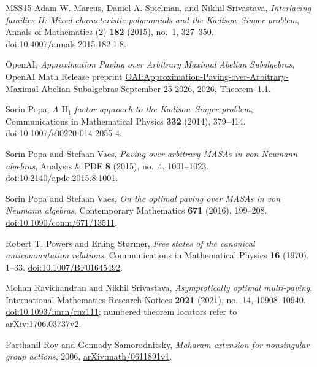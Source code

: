 \begin{thebibliography}{MSS15}
Adam W. Marcus, Daniel A. Spielman, and Nikhil Srivastava,
\emph{Interlacing families II: Mixed characteristic polynomials and the Kadison--Singer problem},
Annals of Mathematics (2) \textbf{182} (2015), no.~1, 327--350.
\href{https://doi.org/10.4007/annals.2015.182.1.8}{doi:10.4007/annals.2015.182.1.8}.

OpenAI,
\emph{Approximation Paving over Arbitrary Maximal Abelian Subalgebras},
OpenAI Math Release preprint
\href{https://github.com/openai/math/blob/main/preprints/Approximation-Paving-over-Arbitrary-Maximal-Abelian-Subalgebras-September-25-2026/Approximation-Paving-over-Arbitrary-Maximal-Abelian-Subalgebras-September-25-2026.pdf}{OAI:Approximation-Paving-over-Arbitrary-Maximal-Abelian-Subalgebras-September-25-2026},
2026, Theorem~1.1.

Sorin Popa,
\emph{A $\mathrm{II}_1$ factor approach to the Kadison--Singer problem},
Communications in Mathematical Physics \textbf{332} (2014), 379--414.
\href{https://doi.org/10.1007/s00220-014-2055-4}{doi:10.1007/s00220-014-2055-4}.

Sorin Popa and Stefaan Vaes,
\emph{Paving over arbitrary MASAs in von Neumann algebras},
Analysis \& PDE \textbf{8} (2015), no.~4, 1001--1023.
\href{https://doi.org/10.2140/apde.2015.8.1001}{doi:10.2140/apde.2015.8.1001}.

Sorin Popa and Stefaan Vaes,
\emph{On the optimal paving over MASAs in von Neumann algebras},
Contemporary Mathematics \textbf{671} (2016), 199--208.
\href{https://doi.org/10.1090/conm/671/13511}{doi:10.1090/conm/671/13511}.

Robert T. Powers and Erling St{\o}rmer,
\emph{Free states of the canonical anticommutation relations},
Communications in Mathematical Physics \textbf{16} (1970), 1--33.
\href{https://doi.org/10.1007/BF01645492}{doi:10.1007/BF01645492}.

Mohan Ravichandran and Nikhil Srivastava,
\emph{Asymptotically optimal multi-paving},
International Mathematics Research Notices \textbf{2021} (2021), no.~14, 10908--10940.
\href{https://doi.org/10.1093/imrn/rnz111}{doi:10.1093/imrn/rnz111};
numbered theorem locators refer to \href{https://arxiv.org/abs/1706.03737v2}{arXiv:1706.03737v2}.

Parthanil Roy and Gennady Samorodnitsky,
\emph{Maharam extension for nonsingular group actions},
2006, \href{https://arxiv.org/abs/math/0611891v1}{arXiv:math/0611891v1}.


\end{thebibliography}
